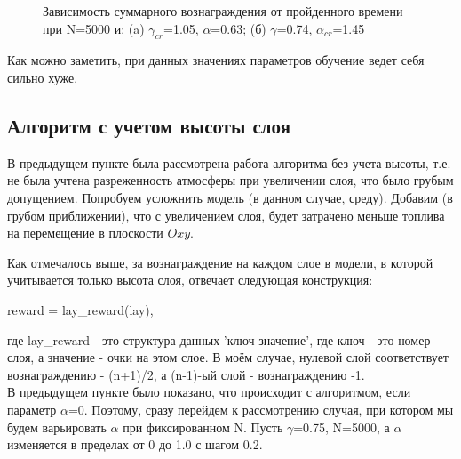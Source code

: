\documentclass[a4paper]{report}
\theoremstyle{definition}
\theoremstyle{plain}
\theoremstyle{remark}
\theoremstyle{remark}
\theoremstyle{definition}
\begin{document}
\begin{figure}[H]
\begin{minipage}[H]{0.49\linewidth}
    \end{minipage}
     \caption{Зависимость суммарного вознаграждения от пройденного времени при N=5000 и: (a) $\gamma_{cr}$=1.05, $\alpha$=0.63; (б) $\gamma$=0.74, $\alpha_{cr}$=1.45}
\end{figure}
Как можно заметить, при данных значениях параметров обучение ведет себя сильно хуже.
\\
\begin{center}
    \subsection{Алгоритм с учетом высоты слоя}
\end{center}

В предыдущем пункте была рассмотрена работа алгоритма без учета высоты, т.е. не была учтена разреженность атмосферы при увеличении слоя, что было грубым допущением. Попробуем усложнить модель (в данном случае, среду). Добавим (в грубом приближении), что с увеличением слоя, будет затрачено меньше топлива на перемещение в плоскости $Oxy$. 

Как отмечалось выше, за вознаграждение на каждом слое в модели, в которой учитывается только высота слоя, отвечает следующая конструкция:
\begin{center}
    reward = lay\_reward(lay),
\end{center}
где lay\_reward - это структура данных 'ключ-значение', где ключ - это номер слоя, а значение - очки на этом слое. В моём случае, нулевой слой соответствует вознаграждению - (n+1)/2, а (n-1)-ый слой - вознаграждению -1.
\\
В предыдущем пункте было показано, что происходит с алгоритмом, если параметр $\alpha$=0. Поэтому, сразу перейдем к рассмотрению случая, при котором мы будем варьировать $\alpha$ при фиксированном N. Пусть $\gamma$=0.75, N=5000, а $\alpha$ изменяется в пределах от 0 до 1.0 с шагом 0.2.
\end{document}
